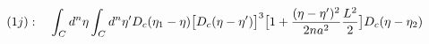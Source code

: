 \begin{equation}
(1j):~~~%
\int_Cd^n\eta\int_Cd^n\eta'D_c(\eta_1 - \eta)\big{[}D_c(\eta - \eta')\big{]}^3\big{[}1 + \frac{(\eta - \eta')^2}{2na^2}\frac{L^2}{2}\big{]}D_c(\eta - \eta_2)
\end{equation}

